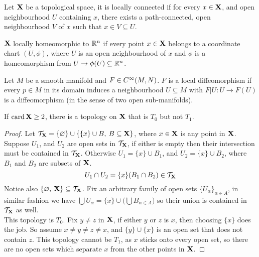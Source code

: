 \documentclass[../../main.tex]{subfiles}
\begin{document}
\begin{definition}\label{chp4:locally-path-connected-definition}
    Let ${\mathbf{X}}$ be a topological space, it is locally connected if for every $x\in{\mathbf{X}}$, and open neighbourhood $U$ containing $x$, there exists a path-connected, open neighbourhood $V$ of $x$ such that $x\in V\subseteq U$.
\end{definition}

\begin{definition}\label{chp4:locally-homeomorphic-definition}
    ${\mathbf{X}}$ locally homeomorphic to ${\mathbb{R}^n}$ if every point $x\in{\mathbf{X}}$ belongs to a coordinate chart $(U,\phi)$, where $U$ is an open neighbourhood of $x$ and $\phi$ is a homeomorphism from $U\to\phi(U)\subseteq{\mathbb{R}^n}$.
\end{definition}

\begin{definition}\label{lee-chp4:local-diffeomorphism-definition}
    Let $M$ be a smooth manifold and $F\in \cinf[M,N]$. $F$ is a local diffeomorphism if every $p\in M$ in its domain induces a neighbourhood $U\subseteq M$ with $F|U:U\to F(U)$ is a diffeomorphism (in the sense of two open sub-manifolds).
\end{definition}





\newpage

\fexercisesHeader

\begin{wts}
    If $\operatorname{card}{{\mathbf{X}}}\geq 2$, there is a topology on ${\mathbf{X}}$ that is $T_0$ but not $T_1$.
\end{wts}
\begin{proof}
    Let $\mathcal{T}_{\mathbf{X}} = \{\varnothing\}\cup\{\{x\}\cup B,\: B\subseteq {\mathbf{X}}\}$, where $x\in{\mathbf{X}}$ is any point in ${\mathbf{X}}$. Suppose $U_1$, and $U_2$ are open sets in $\mathcal{T}_{\mathbf{X}}$, if either is empty then their intersection must be contained in $\mathcal{T}_{\mathbf{X}}$. Otherwise $U_1 = \{x\}\cup B_1$, and $U_2 = \{x\}\cup B_2$, where $B_1$ and $B_2$ are subsets of ${\mathbf{X}}$.
    \[
        U_1\cap U_2 = \{x\}(B_1\cap B_2)\in \mathcal{T}_{\mathbf{X}}
    \]
    Notice also $\{\varnothing,\: {\mathbf{X}}\}\subseteq\mathcal{T}_{\mathbf{X}}$. Fix an arbitrary family of open sets $\{U_\alpha\}_{\alpha\in A}$, in similar fashion we have $\bigcup U_\alpha = \{x\}\cup\biggl( \bigcup B_{\alpha\in A} \biggr)$ so their union is contained in $\mathcal{T}_{\mathbf{X}}$ as well.\\

    This topology is $T_0$. Fix $y\neq z$ in ${\mathbf{X}}$, if either $y$ or $z$ is $x$, then choosing $\{x\}$ does the job. So assume $x\neq y\neq z\neq x$, and $\{y\}\cup \{x\}$ is an open set that does not contain $z$. This topology cannot be $T_1$, as $x$ sticks onto every open set, so there are no open sets which separate $x$ from the other points in ${\mathbf{X}}$.
\end{proof}
\newpage
\end{document}
